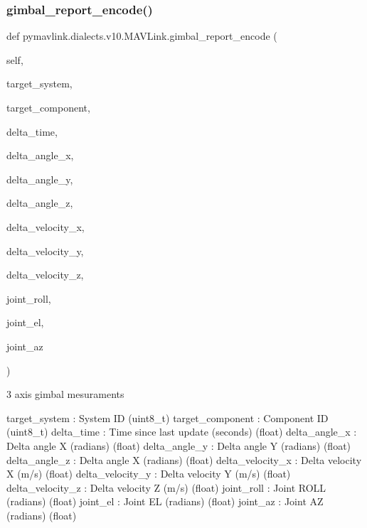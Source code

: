 \begin{DoxyVerb}
\begin{DoxyVerb}
\subsubsection{\texorpdfstring{gimbal\+\_\+report\+\_\+encode()}{gimbal\_report\_encode()}}
{\footnotesize\ttfamily def pymavlink.\+dialects.\+v10.\+M\+A\+V\+Link.\+gimbal\+\_\+report\+\_\+encode (\begin{DoxyParamCaption}\item[{}]{self,  }\item[{}]{target\+\_\+system,  }\item[{}]{target\+\_\+component,  }\item[{}]{delta\+\_\+time,  }\item[{}]{delta\+\_\+angle\+\_\+x,  }\item[{}]{delta\+\_\+angle\+\_\+y,  }\item[{}]{delta\+\_\+angle\+\_\+z,  }\item[{}]{delta\+\_\+velocity\+\_\+x,  }\item[{}]{delta\+\_\+velocity\+\_\+y,  }\item[{}]{delta\+\_\+velocity\+\_\+z,  }\item[{}]{joint\+\_\+roll,  }\item[{}]{joint\+\_\+el,  }\item[{}]{joint\+\_\+az }\end{DoxyParamCaption})}

\begin{DoxyVerb}3 axis gimbal mesuraments

target_system             : System ID (uint8_t)
target_component          : Component ID (uint8_t)
delta_time                : Time since last update (seconds) (float)
delta_angle_x             : Delta angle X (radians) (float)
delta_angle_y             : Delta angle Y (radians) (float)
delta_angle_z             : Delta angle X (radians) (float)
delta_velocity_x          : Delta velocity X (m/s) (float)
delta_velocity_y          : Delta velocity Y (m/s) (float)
delta_velocity_z          : Delta velocity Z (m/s) (float)
joint_roll                : Joint ROLL (radians) (float)
joint_el                  : Joint EL (radians) (float)
joint_az                  : Joint AZ (radians) (float)\end{DoxyVerb}
 \mbox{\label{classpymavlink_1_1dialects_1_1v10_1_1MAVLink_a2f0b103d7f2945770e05ee093877f124}} 

\end{DoxyVerb}
\end{DoxyVerb}
